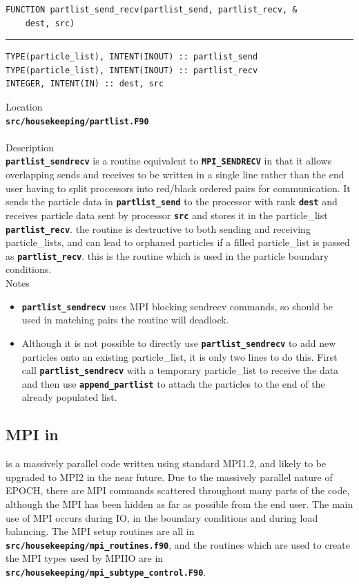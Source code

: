 \documentclass[12pt,a4paper]{article}
\newcommand{\HRule}{\rule{\linewidth}{0.5mm}}
\newcommand{\inlinecode}[1]{{\color{warwickred} \bf\texttt{#1}}}
\newcommand{\EPOCH}{{\color{warwickdark}\fontfamily{phv}\selectfont{EPOCH}}}
\newcommand{\codedef}{\begin{Verbatim}[formatcom=\color{warwickred},fontsize=\Large,hfuzz=0pt]}
\newcommand{\coderule}{
{\color{warwickred}\vspace{-0.5cm}\HRule}
\codedef}
\begin{document}
\pagebreak
\codedef
FUNCTION partlist_send_recv(partlist_send, partlist_recv, &
    dest, src)
\end{Verbatim}
\coderule
TYPE(particle_list), INTENT(INOUT) :: partlist_send
TYPE(particle_list), INTENT(INOUT) :: partlist_recv
INTEGER, INTENT(IN) :: dest, src
\end{Verbatim}
\vspace{1cm}
{\Large Location\\}
\inlinecode{src/housekeeping/partlist.F90}\\
\\[0.5cm]
{\Large Description\\}
\inlinecode{partlist\_sendrecv} is a routine equivalent to
\inlinecode{MPI\_SENDRECV} in that it allows overlapping sends and receives to
be written in a single line rather than the end user having to split processors
into red/black ordered pairs for communication. It sends the particle data in
\inlinecode{partlist\_send} to the processor with rank \inlinecode{dest} and
receives particle data sent by processor \inlinecode{src} and stores it in the
particle\_list \inlinecode{partlist\_recv}. the routine is destructive to both
sending and receiving particle\_lists, and can lead to orphaned particles if a
filled particle\_list is passed as \inlinecode{partlist\_recv}. this is the
routine which is used in the particle boundary conditions.
\\[0.5cm]
{\Large Notes\\}
\begin{itemize}
\item \inlinecode{partlist\_sendrecv} uses MPI blocking sendrecv commands, so
  should be used in matching pairs the routine will deadlock.

\item Although it is not possible to directly use
  \inlinecode{partlist\_sendrecv} to add new particles onto an existing
  particle\_list, it is only two lines to do this. First call
  \inlinecode{partlist\_sendrecv} with a temporary particle\_list to receive the
  data and then use \inlinecode{append\_partlist} to attach the particles to
  the end of the already populated list.
\end{itemize}
\pagebreak


\subsection{MPI in {\EPOCH}}
{\EPOCH} is a massively parallel code written using standard MPI1.2, and likely
to be upgraded to MPI2 in the near future. Due to the massively parallel nature
of EPOCH, there are MPI commands scattered throughout many parts of the code,
although the MPI has been hidden as far as possible from the end user. The main
use of MPI occurs during IO, in the boundary conditions and during load
balancing. The MPI setup routines are all in
\inlinecode{src/housekeeping/mpi\_routines.f90}, and the routines which are
used to create the MPI types used by MPIIO are in
\inlinecode{src/housekeeping/mpi\_subtype\_control.F90}.
\end{document}
